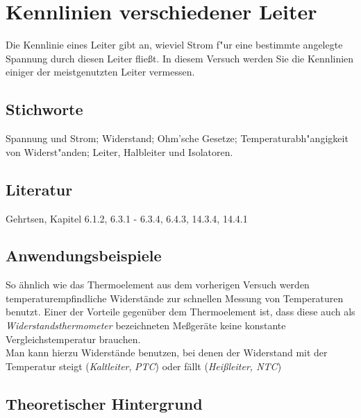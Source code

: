 \chapter{Kennlinien verschiedener Leiter}
\label{v:12}

Die Kennlinie eines Leiter gibt an, wieviel Strom f"ur eine bestimmte angelegte Spannung durch diesen Leiter flie{\ss}t. In diesem Versuch werden Sie die Kennlinien einiger der meistgenutzten Leiter vermessen.

\section{Stichworte}

Spannung und Strom; Widerstand; Ohm'sche Gesetze; Temperaturabh"angigkeit von Widerst"anden; Leiter, Halbleiter und Isolatoren.

\section{Literatur}

Gehrtsen, Kapitel 6.1.2, 6.3.1 - 6.3.4, 6.4.3, 14.3.4, 14.4.1

\section{Anwendungsbeispiele}

So ähnlich wie das Thermoelement aus dem vorherigen Versuch werden temperaturempfindliche Widerstände zur schnellen Messung von Temperaturen benutzt. Einer der Vorteile gegenüber dem Thermoelement ist, dass diese auch als \textit{Widerstandsthermometer} bezeichneten Meßgeräte keine konstante Vergleichstemperatur brauchen.\\
Man kann hierzu Widerstände benutzen, bei denen der Widerstand mit der Temperatur steigt (\textit{Kaltleiter}, \textit{PTC}) oder fällt (\textit{Heißleiter, NTC})

\section{Theoretischer Hintergrund}

